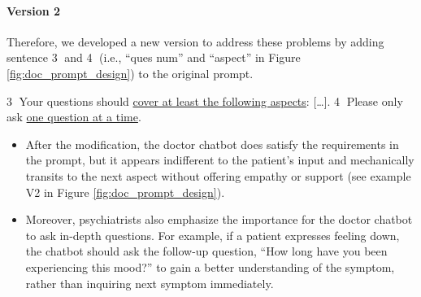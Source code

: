 \paragraph{Version 2}
Therefore, we developed a new version to address these problems by adding sentence \textcircled{3} and \textcircled{4} (i.e., ``ques num'' and ``aspect'' in Figure \ref{fig:doc_prompt_design}) to the original prompt. 
\begin{prompt}
    \textcircled{3} Your questions should \uline{cover at least the following aspects}: [\ldots]\protect\footnotemark. 
    \textcircled{4} Please only ask \uline{one question at a time}.
\end{prompt}
\begin{itemize}
    \item After the modification, the doctor chatbot does satisfy the requirements in the prompt, but it appears indifferent to the patient's input and mechanically transits to the next aspect without offering empathy or support (see example V2 in Figure \ref{fig:doc_prompt_design}).
    \item Moreover, psychiatrists also emphasize the importance for the doctor chatbot to ask in-depth questions. For example, if a patient expresses feeling down, the chatbot should ask the follow-up question, ``How long have you been experiencing this mood?'' to gain a better understanding of the symptom, rather than inquiring next symptom immediately.
\end{itemize}


